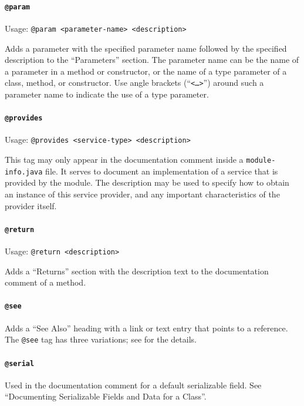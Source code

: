 \documentclass[11pt,a4paper, titlepage, parskip=half, headsepline, footsepline, cleardoublepage=current, headheight=1cm]{scrbook}
\begin{document}
\paragraph{\lstinline|@param|}\label{sec:TagParam}  Usage: \lstinline|@param <parameter-name> <description>|

Adds a parameter with the specified parameter name followed by the specified description to the “Parameters” section. The parameter name can be the name of a parameter in a method or constructor, or the name of a type parameter of a class, method, or constructor. Use angle brackets (“\verb#<…>#”) around such a parameter name to indicate the use of a type parameter.

\paragraph{\lstinline|@provides|}\label{sec:TagProvides}  Usage: \lstinline|@provides <service-type> <description>|

This tag may only appear in the documentation comment inside a \verb#module-info.java# file. It serves to document an implementation of a service that is provided by the module. The description may be used to specify how to obtain an instance of this service provider, and any important characteristics of the provider itself. 

\paragraph{\lstinline|@return|}\label{sec:TagReturn}  Usage: \lstinline|@return <description>|

Adds a “Returns” section with the description text to the documentation comment of a method.

\paragraph{\lstinline|@see|}\label{sec:TagSee}  Adds a “See Also” heading with a link or text entry that points to a reference. The \lstinline|@see| tag has three variations; see \autocite{ORACLE_DOC_JAVADOC_TAG} for the details.

\paragraph{\lstinline|@serial|}\label{sec:TagSerial} Used in the documentation comment for a default serializable field. See “Documenting Serializable Fields and Data for a Class”\autocite{ORACLE_DOC_OBJECT_SERIALIZATION:DocumentingSerializableFieldsData}. 
\end{document}
